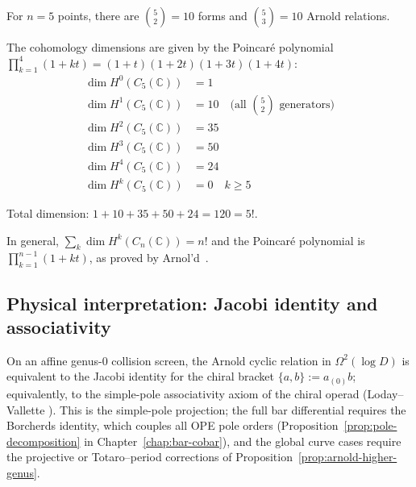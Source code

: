 \begin{example}[\texorpdfstring{$n=5$}{n=5}: complete computation]
\label{ex:arnold-n5-complete}

For $n=5$ points, there are $\binom{5}{2} = 10$ forms and $\binom{5}{3} = 10$ Arnold
relations.

The cohomology dimensions are given by the Poincar\'e polynomial
$\prod_{k=1}^{4}(1+kt) = (1+t)(1+2t)(1+3t)(1+4t)$:
\begin{align}
\dim H^0(C_5(\mathbb{C})) &= 1\\
\dim H^1(C_5(\mathbb{C})) &= 10 \quad \text{(all $\binom{5}{2}$ generators)}\\
\dim H^2(C_5(\mathbb{C})) &= 35\\
\dim H^3(C_5(\mathbb{C})) &= 50\\
\dim H^4(C_5(\mathbb{C})) &= 24\\
\dim H^k(C_5(\mathbb{C})) &= 0 \quad k \geq 5
\end{align}

Total dimension: $1 + 10 + 35 + 50 + 24 = 120 = 5!$.

In general, $\sum_k \dim H^k(C_n(\mathbb{C})) = n!$ and the Poincar\'e polynomial
is $\prod_{k=1}^{n-1}(1+kt)$, as proved by Arnol'd~\cite{Arnold69}.
\end{example}

\subsection{Physical interpretation: Jacobi identity and associativity}
\label{sec:arnold-physical}

\begin{theorem}
\label{thm:arnold-jacobi}
On an affine genus-$0$ collision screen, the Arnold cyclic relation in
$\Omega^2(\log D)$ is equivalent to the Jacobi identity for the chiral
bracket $\{a,b\} := a_{(0)}b$; equivalently, to the simple-pole
associativity axiom of the chiral operad (Loday--Vallette
\cite[Theorem~7.1.3, \S7.6]{LV12}). This is the simple-pole projection;
the full bar differential requires the Borcherds identity, which
couples all OPE pole orders (Proposition~\ref{prop:pole-decomposition}
in Chapter~\ref{chap:bar-cobar}), and the global curve cases require
the projective or Totaro--period corrections of
Proposition~\ref{prop:arnold-higher-genus}.
\end{theorem}

